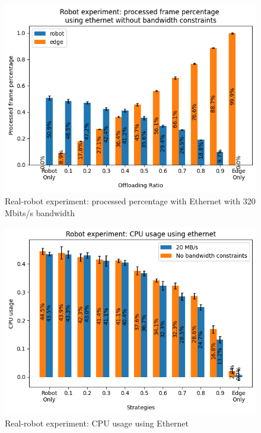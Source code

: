 \begin{figure}
    \centering
    \includegraphics[width=\linewidth]{figures/experiment/real_robot/eth/frame_percentage_320.png}
    \caption{Real-robot experiment: processed percentage with Ethernet with 320 Mbits/s bandwidth}
    \label{fig:real_robot_experiment:eth_processed_frame_percentage_320}
\end{figure}

\begin{figure}
    \centering
    \includegraphics[width=\linewidth]{figures/experiment/real_robot/eth/cpu_percentage.png}
    \caption{Real-robot experiment: CPU usage using Ethernet}
    \label{fig:real_robot_experiment:eth_cpu_percentage}
\end{figure}

